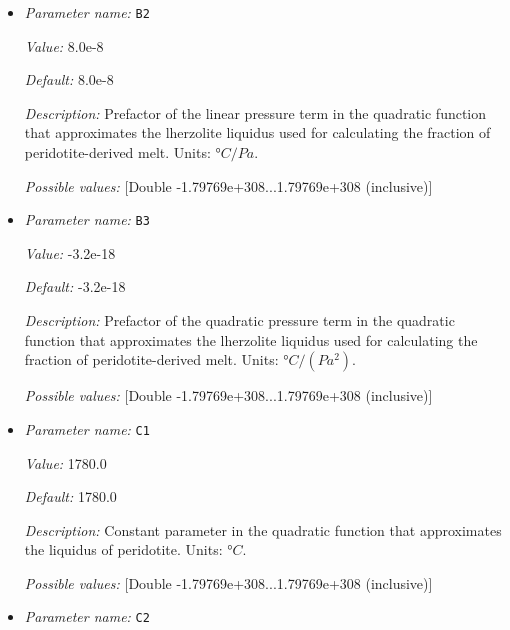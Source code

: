 \begin{itemize}
{\it Default:} 1475.0


{\it Description:} Constant parameter in the quadratic function that approximates the lherzolite liquidus used for calculating the fraction of peridotite-derived melt. Units: $°C$.


{\it Possible values:} [Double -1.79769e+308...1.79769e+308 (inclusive)]
\item {\it Parameter name:} {\tt B2}
\label{parameters:Postprocess/Visualization/Melt fraction/B2}


{\it Value:} 8.0e-8


{\it Default:} 8.0e-8


{\it Description:} Prefactor of the linear pressure term in the quadratic function that approximates the  lherzolite liquidus used for calculating the fraction of peridotite-derived melt. Units: $°C/Pa$.


{\it Possible values:} [Double -1.79769e+308...1.79769e+308 (inclusive)]
\item {\it Parameter name:} {\tt B3}
\label{parameters:Postprocess/Visualization/Melt fraction/B3}


{\it Value:} -3.2e-18


{\it Default:} -3.2e-18


{\it Description:} Prefactor of the quadratic pressure term in the quadratic function that approximates the  lherzolite liquidus used for calculating the fraction of peridotite-derived melt. Units: $°C/(Pa^2)$.


{\it Possible values:} [Double -1.79769e+308...1.79769e+308 (inclusive)]
\item {\it Parameter name:} {\tt C1}
\label{parameters:Postprocess/Visualization/Melt fraction/C1}


{\it Value:} 1780.0


{\it Default:} 1780.0


{\it Description:} Constant parameter in the quadratic function that approximates the liquidus of peridotite. Units: $°C$.


{\it Possible values:} [Double -1.79769e+308...1.79769e+308 (inclusive)]
\item {\it Parameter name:} {\tt C2}
\label{parameters:Postprocess/Visualization/Melt fraction/C2}



\end{itemize}
